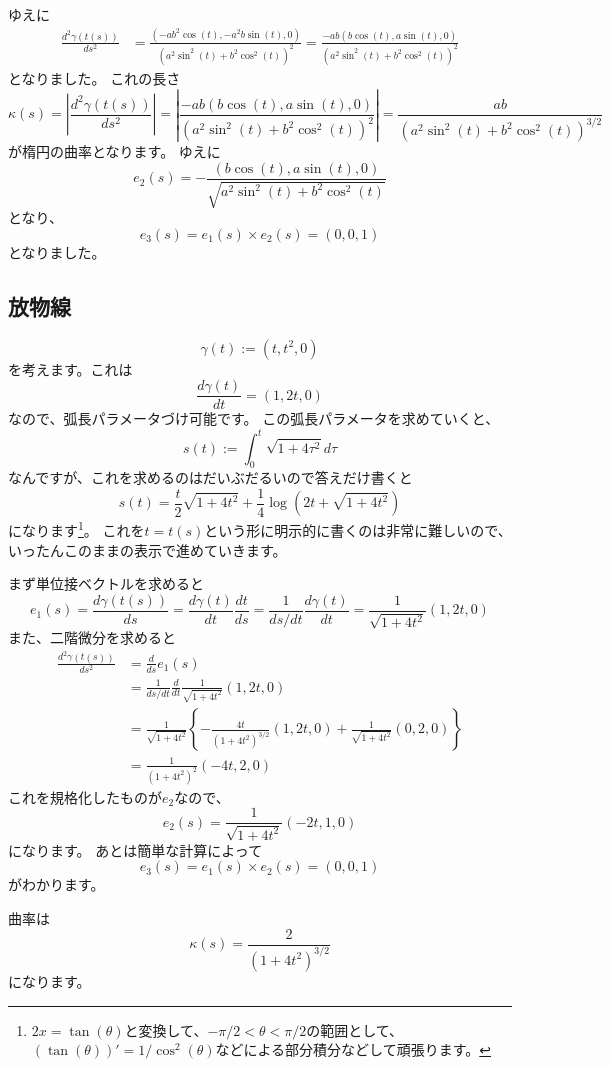 ゆえに
\begin{align*}
  \frac{d^2\gamma(t(s))}{ds^2}&=\frac{(-ab^2\cos(t),-a^2b\sin(t),0)}{(a^2\sin^2(t)+b^2\cos^2(t))^2}=\frac{-ab(b\cos(t),a\sin(t),0)}{(a^2\sin^2(t)+b^2\cos^2(t))^2}
\end{align*}
となりました。
これの長さ
\[
  \kappa(s)=\left|\frac{d^2\gamma(t(s))}{ds^2}\right|=\left|\frac{-ab(b\cos(t),a\sin(t),0)}{(a^2\sin^2(t)+b^2\cos^2(t))^2}\right|=\frac{ab}{(a^2\sin^2(t)+b^2\cos^2(t))^{3/2}}
\]
が楕円の曲率となります。
ゆえに
\[
  e_2(s)=-\frac{(b\cos(t),a\sin(t),0)}{\sqrt{a^2\sin^2(t)+b^2\cos^2(t)}}
\]
となり、
\[
  e_3(s)=e_1(s)\times e_2(s)=(0,0,1)
\]
となりました。

\subsection{放物線}

\[
  \gamma(t):=(t,t^2,0)
\]
を考えます。これは
\[
  \frac{d\gamma(t)}{dt}=(1,2t,0)
\]
なので、弧長パラメータづけ可能です。
この弧長パラメータを求めていくと、
\[
  s(t):=\int_0^t\sqrt{1+4\tau^2}d\tau
\]
なんですが、これを求めるのはだいぶだるいので答えだけ書くと
\[
  s(t)=\frac{t}{2}\sqrt{1+4t^2}+\frac{1}{4}\log(2t+\sqrt{1+4t^2})
\]
になります\footnote{
  $2x=\tan(\theta)$と変換して、$-\pi/2<\theta<\pi/2$の範囲として、$(\tan(\theta))'=1/\cos^2(\theta)$などによる部分積分などして頑張ります。
}。
これを$t=t(s)$という形に明示的に書くのは非常に難しいので、いったんこのままの表示で進めていきます。

まず単位接ベクトルを求めると
\[
  e_1(s)=\frac{d\gamma(t(s))}{ds}=\frac{d\gamma(t)}{dt}\frac{dt}{ds}=\frac1{ds/dt}\frac{d\gamma(t)}{dt}=\frac1{\sqrt{1+4t^2}}(1,2t,0)
\]
また、二階微分を求めると
\begin{align*}
  \frac{d^2\gamma(t(s))}{ds^2}&=\frac{d}{ds}e_1(s)\\
  &=\frac1{ds/dt}\frac{d}{dt}\frac1{\sqrt{1+4t^2}}(1,2t,0)\\
  &=\frac1{\sqrt{1+4t^2}}\left\{-\frac{4t}{(1+4t^2)^{3/2}}(1,2t,0)+\frac1{\sqrt{1+4t^2}}(0,2,0)\right\}\\
  &=\frac1{(1+4t^2)^2}(-4t,2,0)
\end{align*}
これを規格化したものが$e_2$なので、
\[
  e_2(s)=\frac{1}{\sqrt{1+4t^2}}(-2t,1,0)
\]
になります。
あとは簡単な計算によって
\[
  e_3(s)=e_1(s)\times e_2(s)=(0,0,1)
\]
がわかります。

曲率は
\[
  \kappa(s)=\frac{2}{(1+4t^2)^{3/2}}
\]
になります。
